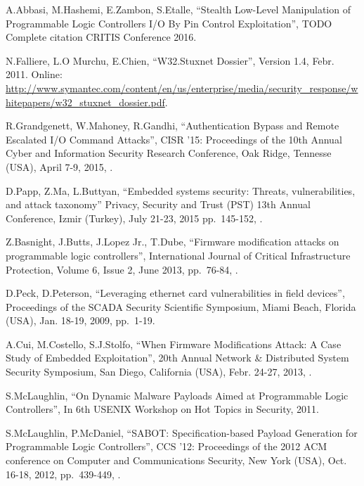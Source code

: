 \begin{thebibliography}{99}

A.Abbasi, M.Hashemi, E.Zambon, S.Etalle,
``Stealth Low-Level Manipulation of Programmable Logic Controllers I/O By Pin Control Exploitation'',
TODO Complete citation CRITIS Conference 2016.

N.Falliere, L.O Murchu, E.Chien,
``W32.Stuxnet  Dossier'',
Version 1.4, Febr. 2011.
Online: \url{http://www.symantec.com/content/en/us/enterprise/media/security_response/whitepapers/w32_stuxnet_dossier.pdf}.

R.Grandgenett, W.Mahoney, R.Gandhi,
``Authentication Bypass and Remote Escalated I/O Command Attacks'',
CISR '15: Proceedings of the 10th Annual Cyber and Information Security Research Conference,
Oak Ridge, Tennesse (USA), April 7-9, 2015,
.

D.Papp, Z.Ma, L.Buttyan,
``Embedded systems security: Threats, vulnerabilities, and attack taxonomy''
Privacy, Security and Trust (PST) 13th Annual Conference,
Izmir (Turkey), July 21-23, 2015
pp.\ 145-152,
.

Z.Basnight, J.Butts, J.Lopez Jr., T.Dube,
``Firmware modification attacks on programmable logic controllers'',
International Journal of Critical Infrastructure Protection,
Volume 6, Issue 2, June 2013,
pp.\ 76-84,
.

D.Peck, D.Peterson,
``Leveraging ethernet card vulnerabilities in field devices'',
Proceedings of the SCADA Security Scientific Symposium,
Miami Beach, Florida (USA), Jan. 18-19, 2009,
pp.\ 1-19.

A.Cui, M.Costello, S.J.Stolfo,
``When Firmware Modifications Attack: A Case Study of Embedded Exploitation'',
20th Annual Network \& Distributed System Security Symposium,
San Diego, California (USA), Febr. 24-27, 2013,
.

S.McLaughlin,
``On Dynamic Malware Payloads Aimed at Programmable Logic Controllers'',
In 6th USENIX Workshop on Hot Topics in Security,
2011.

S.McLaughlin, P.McDaniel,
``SABOT: Specification-based Payload Generation for Programmable Logic Controllers'',
CCS '12: Proceedings of the 2012 ACM conference on Computer and Communications Security,
New York (USA), Oct. 16-18, 2012,
pp.\ 439-449,
.


\end{thebibliography}
